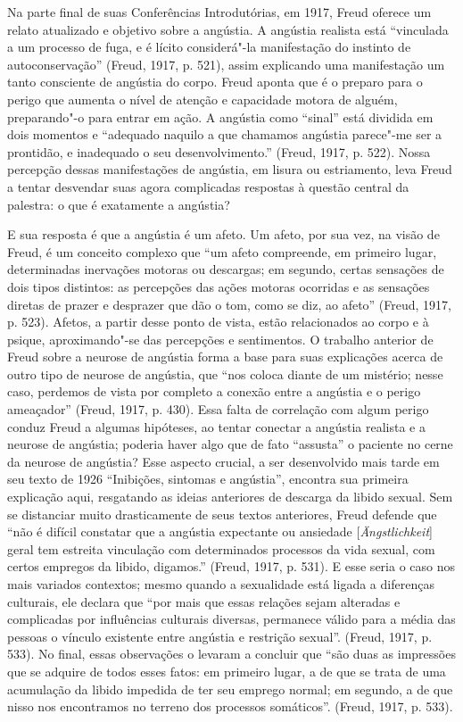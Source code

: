 Na parte final de suas Conferências Introdutórias, em 1917, Freud
oferece um relato atualizado e objetivo sobre a angústia. A angústia
realista está ``vinculada a um processo de fuga, e é lícito considerá"-la
manifestação do instinto de autoconservação'' (Freud, 1917, p. 521),
assim explicando uma manifestação um tanto consciente de angústia do
corpo. Freud aponta que é o preparo para o perigo que aumenta o nível de
atenção e capacidade motora de alguém, preparando"-o para entrar em ação.
A angústia como ``sinal'' está dividida em dois momentos e ``adequado
naquilo a que chamamos angústia parece"-me ser a prontidão, e inadequado
o seu desenvolvimento.'' (Freud, 1917, p. 522). Nossa percepção dessas
manifestações de angústia, em lisura ou estriamento, leva Freud a tentar
desvendar suas agora complicadas respostas à questão central da
palestra: o que é exatamente a angústia?

E sua resposta é que a angústia é um afeto. Um afeto, por sua vez, na
visão de Freud, é um conceito complexo que ``um afeto compreende, em
primeiro lugar, determinadas inervações motoras ou descargas; em
segundo, certas sensações de dois tipos distintos: as percepções das
ações motoras ocorridas e as sensações diretas de prazer e desprazer que
dão o tom, como se diz, ao afeto'' (Freud, 1917, p. 523). Afetos, a
partir desse ponto de vista, estão relacionados ao corpo e à psique,
aproximando"-se das percepções e sentimentos. O trabalho anterior de
Freud sobre a neurose de angústia forma a base para suas explicações
acerca de outro tipo de neurose de angústia, que ``nos coloca diante de
um mistério; nesse caso, perdemos de vista por completo a conexão entre
a angústia e o perigo ameaçador'' (Freud, 1917, p. 430). Essa falta de
correlação com algum perigo conduz Freud a algumas hipóteses, ao tentar
conectar a angústia realista e a neurose de angústia; poderia haver algo
que de fato ``assusta'' o paciente no cerne da neurose de angústia? Esse
aspecto crucial, a ser desenvolvido mais tarde em seu texto de 1926
``Inibições, sintomas e angústia'', encontra sua primeira explicação
aqui, resgatando as ideias anteriores de descarga da libido sexual. Sem
se distanciar muito drasticamente de seus textos anteriores, Freud
defende que ``não é difícil constatar que a angústia expectante ou
ansiedade {[}\emph{Ängstlichkeit}{]} geral tem estreita vinculação com
determinados processos da vida sexual, com certos empregos da libido,
digamos.'' (Freud, 1917, p. 531). E esse seria o caso nos mais variados
contextos; mesmo quando a sexualidade está ligada a diferenças
culturais, ele declara que ``por mais que essas relações sejam alteradas
e complicadas por influências culturais diversas, permanece válido para
a média das pessoas o vínculo existente entre angústia e restrição
sexual''. (Freud, 1917, p. 533). No final, essas observações o levaram a
concluir que ``são duas as impressões que se adquire de todos esses
fatos: em primeiro lugar, a de que se trata de uma acumulação da libido
impedida de ter seu emprego normal; em segundo, a de que nisso nos
encontramos no terreno dos processos somáticos''. (Freud, 1917, p. 533).

